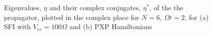 \begin{figure}
  \centering
  \caption{Eigenvalues, $\eta$ and their complex conjugates, $\eta^*$,
    of the the propagator, plotted in the complex place for $N=6$,
    $\Omega t=2$, for (a) SFI with $V_{rr}=100\Omega$ and (b) PXP
    Hamiltonians}
\end{figure}


